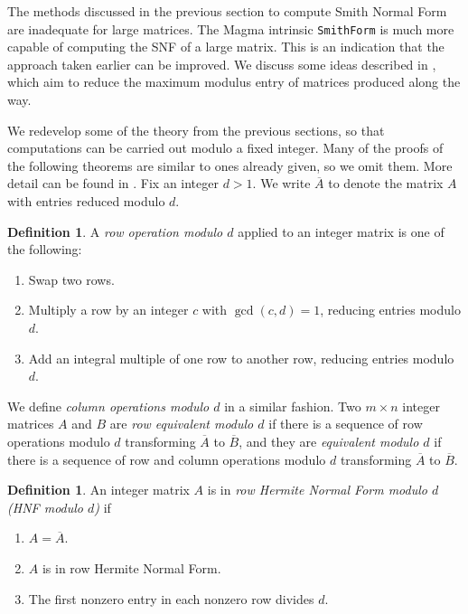 \documentclass[12pt,a4paper,answers]{exam}
\theoremstyle{definition}
\newtheorem{definition}[theorem]{Definition}
\begin{document}
The methods discussed in the previous section to compute Smith Normal Form are inadequate for large matrices. The {\sc Magma} intrinsic \texttt{SmithForm} is much more capable of computing the SNF of a large matrix. This is an indication that the approach taken earlier can be improved. We discuss some ideas described in \cite[Chapter 8, Section 4]{sims}, which aim to reduce the maximum modulus entry of matrices produced along the way.

We redevelop some of the theory from the previous sections, so that computations can be carried out modulo a fixed integer. Many of the proofs of the following theorems are similar to ones already given, so we omit them. More detail can be found in \cite[Chapter 8, Section 4]{sims}. Fix an integer $d>1$. We write $\overline{A}$ to denote the matrix $A$ with entries reduced modulo $d$.

\begin{definition}
  A \emph{row operation modulo $d$} applied to an integer matrix is one of the following:
  \begin{enumerate}
  \item Swap two rows.
  \item Multiply a row by an integer $c$ with $\gcd(c,d)=1$, reducing entries modulo $d$.
  \item Add an integral multiple of one row to another row, reducing entries modulo $d$.
  \end{enumerate}
  We define \emph{column operations modulo $d$} in a similar fashion. Two $m\times n$ integer matrices $A$ and $B$ are \emph{row equivalent modulo $d$} if there is a sequence of row operations modulo $d$ transforming $\overline{A}$ to $\overline{B}$, and they are \emph{equivalent modulo $d$} if there is a sequence of row and column operations modulo $d$ transforming $\overline{A}$ to $\overline{B}$.
\end{definition}

\begin{definition}
  An integer matrix $A$ is in \emph{row Hermite Normal Form modulo $d$ (HNF modulo $d$)} if
  \begin{enumerate}
  \item $A=\overline{A}$.
  \item $A$ is in row Hermite Normal Form.
  \item The first nonzero entry in each nonzero row divides $d$.
  \end{enumerate}
\end{definition}
\end{document}

